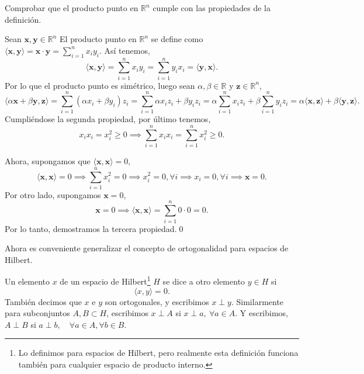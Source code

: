 \documentclass[12pt]{book}
\begin{document}
\begin{exampleenv}

Comprobar que el producto punto en $\mathbb{R}^n$ cumple con las propiedades de la definición.

Sean $\mathbf{x},\mathbf{y}\in\mathbb{R}^n$ El producto punto en $\mathbb{R}^n$ se define como $\langle \mathbf{x},\mathbf{y}\rangle=\mathbf{x}\cdot \mathbf{y}=\sum\limits_{i=1}^n x_iy_i$. Así tenemos,
\[
    \langle\mathbf{x},\mathbf{y}\rangle = \sum\limits_{i=1}^n x_iy_i= \sum\limits_{i=1}^n y_ix_i=\langle \mathbf{y},\mathbf{x}\rangle.
\]
Por lo que el producto punto es simétrico, luego sean $\alpha,\beta \in\mathbb{R}$ y $\mathbf{z}\in\mathbb{R}^n$,
\[
    \langle \alpha \mathbf{x}+\beta \mathbf{y},\mathbf{z}\rangle = \sum\limits_{i=1}^n (\alpha x_i+\beta y_i)z_i=\sum\limits_{i=1}^n \alpha x_iz_i+\beta y_iz_i=\alpha\sum\limits_{i=1}^n  x_iz_i+\beta\sum\limits_{i=1}^n y_iz_i=\alpha\langle \mathbf{x},\mathbf{z}\rangle+\beta \langle\mathbf{y},\mathbf{z\rangle}.
\]
Cumpliéndose la segunda propiedad, por último tenemos,
\[
    x_ix_i=x_i^2 \ge 0\implies \sum\limits_{i=1}^n x_ix_i=\sum\limits_{i=1}^n x_i^2 \ge 0.
\]

Ahora, supongamos que $\langle \mathbf{x},\mathbf{x}
\rangle=0$,
\[
    \langle \mathbf{x},\mathbf{x}\rangle=0 \implies \sum\limits_{i=1}^n x_i^2=0\implies x_i^2=0, \forall i\implies x_i=0, \forall i \implies \mathbf{x}=0.
\]
Por otro lado, supongamos $\mathbf{x}=0$,
\[
    \mathbf{x}=0\implies \langle \mathbf{x},\mathbf{x}\rangle = \sum\limits_{i=1}^n 0\cdot0=0.
\]
Por lo tanto, demostramos la tercera propiedad.\qed \\
\end{exampleenv}

Ahora es conveniente generalizar el concepto de ortogonalidad para espacios de Hilbert.

\begin{definitionenv}
    Un elemento $x$ de un espacio de Hilbert\footnote{Lo definimos para espacios de Hilbert, pero realmente esta definición funciona también para cualquier espacio de producto interno.} $H$ se dice  a otro elemento $y\in H$ si
    \[
        \langle x,y\rangle = 0.
    \]
    También decimos que $x$ e $y$ son ortogonales, y escribimos $x\perp y$. Similarmente para subconjuntos $A,B\subset H$, escribimos $x\perp A$ si $x\perp a, \ \forall a\in A$. Y escribimos, $A\perp B$ si $a\perp b,\quad \forall a\in A,\forall b\in B$.
\end{definitionenv}
\end{document}
